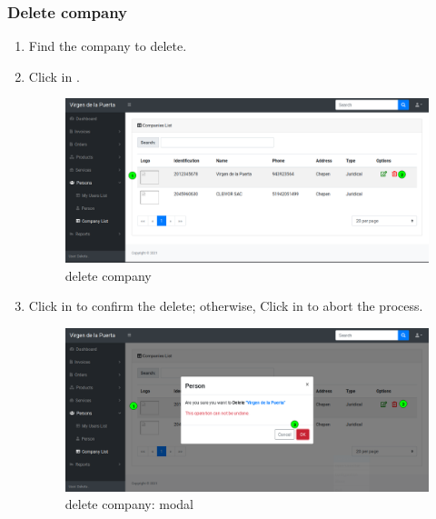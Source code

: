 \documentclass[a4paper,11pt]{refart}
\begin{document}
\subsubsection{Delete company}
\begin{enumerate}
	\item Find the company to delete.
	\item Click in .
	\begin{figure}[H]\centering
		\includegraphics[width=\textwidth]{images/company_list-delete.png}
		\caption{delete company}
		\label{fig:company_list-delete}
	\end{figure}
	\item Click in  to confirm the delete; otherwise, Click in  to abort the process.
	\begin{figure}[H]\centering
		\includegraphics[width=\textwidth]{images/company_list-delete-modal.png}
		\caption{delete company: modal}
		\label{fig:company_list-delete-modal}
	\end{figure}
\end{enumerate}
\end{document}
